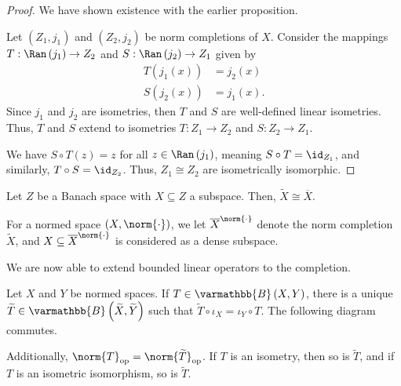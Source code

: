 \documentclass[10pt]{mypackage}
\renewcommand*{\mathbb}[1]{\varmathbb{#1}}
\newcommand{\B}{\mathbb{B}}
\begin{document}
\begin{proof}
  We have shown existence with the earlier proposition.\newline

  Let $\left(Z_1,j_1\right)$ and $\left(Z_2,j_2\right)$ be norm completions of $X$. Consider the mappings $T: \Ran\left(j_1\right) \rightarrow Z_2$ and $S: \Ran\left(j_2\right) \rightarrow Z_1$ given by
  \begin{align*}
    T\left(j_1(x)\right) &= j_2(x)\\
    S\left(j_2(x)\right) &= j_1(x).
  \end{align*}
  Since $j_1$ and $j_2$ are isometries, then $T$ and $S$ are well-defined linear isometries. Thus, $T$ and $S$ extend to isometries $T: Z_1\rightarrow Z_2$ and $S: Z_2\rightarrow Z_1$.\newline

  We have $S\circ T(z) = z$ for all $z\in \Ran\left(j_1\right)$, meaning $S\circ T = \id_{Z_1}$, and similarly, $T\circ S = \id_{Z_2}$. Thus, $Z_1\cong Z_2$ are isometrically isomorphic.
\end{proof}
\begin{corollary}
  Let $Z$ be a Banach space with $X\subseteq Z$ a subspace. Then, $\widetilde{X} \cong \overline{X}$.
\end{corollary}
\begin{remark}
  For a normed space $\left(X,\norm{\cdot}\right)$, we let $\overline{X}^{\norm{\cdot}}$ denote the norm completion $\widetilde{X}$, and $X\subseteq \overline{X}^{\norm{\cdot}}$ is considered as a dense subspace.
\end{remark}
We are now able to extend bounded linear operators to the completion.
\begin{proposition}
  Let $X$ and $Y$ be normed spaces. If $T\in \B\left(X,Y\right)$, there is a unique $\widetilde{T}\in \B\left(\widetilde{X},\widetilde{Y}\right)$ such that $\widetilde{T}\circ \iota_X = \iota_Y\circ T$. The following diagram commutes.
  \begin{center}
Additionally, $\norm{T}_{\text{op}} = \norm{\widetilde{T}}_{\text{op}}$. If $T$ is an isometry, then so is $\widetilde{T}$, and if $T$ is an isometric isomorphism, so is $\widetilde{T}$.
  \end{center}
\end{proposition}
\end{document}
